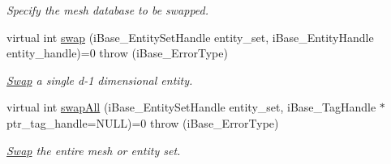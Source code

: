 \begin{DoxyCompactItemize}
\begin{DoxyCompactList}\small\item\em Specify the mesh database to be swapped. \item\end{DoxyCompactList}\item 
virtual int \hyperlink{class_i_t_a_p_s___swap_1_1_swap_adfb444f7ade3254ba8fa9ced2ec15e65}{swap} (iBase\_\-EntitySetHandle entity\_\-set, iBase\_\-EntityHandle entity\_\-handle)=0  throw (iBase\_\-ErrorType)
\begin{DoxyCompactList}\small\item\em \hyperlink{class_i_t_a_p_s___swap_1_1_swap}{Swap} a single d-\/1 dimensional entity. \item\end{DoxyCompactList}\item 
virtual int \hyperlink{class_i_t_a_p_s___swap_1_1_swap_a8a1fdc1a12fb71dfe28881b10277eafc}{swapAll} (iBase\_\-EntitySetHandle entity\_\-set, iBase\_\-TagHandle $\ast$ptr\_\-tag\_\-handle=NULL)=0  throw (iBase\_\-ErrorType)
\begin{DoxyCompactList}\small\item\em \hyperlink{class_i_t_a_p_s___swap_1_1_swap}{Swap} the entire mesh or entity set. \item\end{DoxyCompactList}\end{DoxyCompactItemize}
